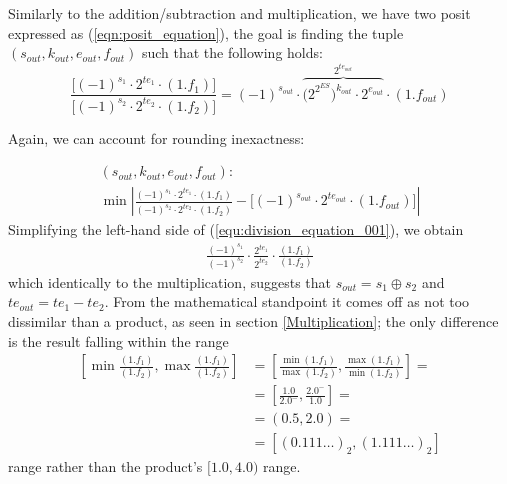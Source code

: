 Similarly to the addition/subtraction and multiplication, we have two posit expressed as (\eqref{eqn:posit_equation}), the goal is finding the tuple $(s_{out}, k_{out}, e_{out}, f_{out})$ such that
the following holds:
\begin{equation}\label{equ:division_equation_001}
    \frac{\big[ (-1)^{s_1} \cdot 2^{te_1} \cdot (1.f_1) \big]}{\big[ (-1)^{s_2} \cdot 2^{te_2} \cdot (1.f_2) \big]} = (-1)^{s_{out}} \cdot \overbrace{\big(2^{2^{ES}}\big)^{k_{out}} \cdot 2^{e_{out}}}^{2^{te_{out}}} \cdot (1.f_{out})
\end{equation}

Again, we can account for rounding inexactness:


\begin{equation}
\begin{gathered}
    (s_{out}, k_{out}, e_{out}, f_{out}): \\
    \min \left| \frac{ (-1)^{s_1} \cdot 2^{te_1} \cdot (1.f_1)}{(-1)^{s_2} \cdot 2^{te_2} \cdot (1.f_2)} - \big[ (-1)^{s_{out}} \cdot 2^{te_{out}} \cdot (1.f_{out}) \big] \right|
\end{gathered}
\end{equation}
Simplifying the left-hand side of (\ref{equ:division_equation_001}), we obtain
\begin{equation}
\begin{gathered}
    \frac{(-1)^{s_1}}{(-1)^{s_2}} \cdot \frac{2^{te_1}}{2^{te_2}} \cdot \frac{(1.f_1)}{(1.f_2)}
\end{gathered}
\end{equation}
which identically to the multiplication, suggests that $s_{out} = s_1 \oplus s_2$ and $te_{out} = te_1 - te_2$.
From the mathematical standpoint it comes off as not too dissimilar than a product, as seen in section \ref{Multiplication}; the only difference is the result falling within the range
\begin{equation}\label{equ:min_max_frac_0010032}
\begin{aligned}
\left[\min{\frac{(1.f_1)}{(1.f_2)}}, \max{\frac{(1.f_1)}{(1.f_2)}} \right] &= \left[\frac{\min{(1.f_1)}}{\max{(1.f_2)}}, \frac{\max{(1.f_1)}}{\min{(1.f_2)}} \right] = \\
&= \left[\frac{1.0}{2.0^{-}}, \frac{2.0^{-}}{1.0} \right] =\\
&= \left(0.5, 2.0 \right) = \\
&= \left[(0.111\dots)_2, (1.111\dots)_2 \right]
\end{aligned}
\end{equation}
range rather than the product's $[1.0, 4.0)$ range.


